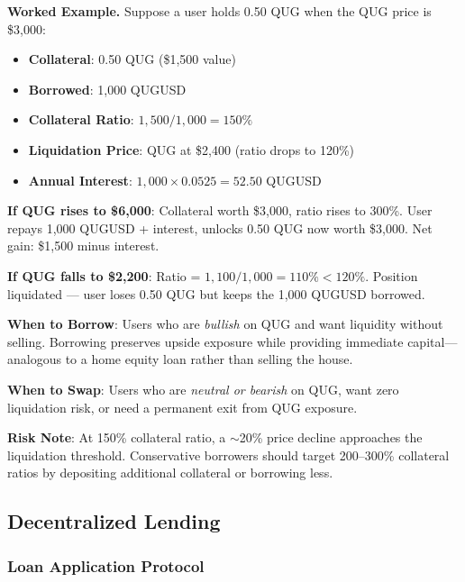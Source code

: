 \documentclass[11pt,a4paper]{article}
\begin{document}
\textbf{Worked Example.} Suppose a user holds 0.50 QUG when the QUG price is \$3{,}000:

\begin{tcolorbox}[colback=codebg,colframe=qnkblue!50!black,title=CDP Borrowing Scenario]
\begin{itemize}[leftmargin=*,noitemsep]
    \item \textbf{Collateral}: 0.50 QUG (\$1{,}500 value)
    \item \textbf{Borrowed}: 1{,}000 QUGUSD
    \item \textbf{Collateral Ratio}: $1{,}500 / 1{,}000 = 150\%$
    \item \textbf{Liquidation Price}: QUG at \$2{,}400 (ratio drops to 120\%)
    \item \textbf{Annual Interest}: $1{,}000 \times 0.0525 = 52.50$ QUGUSD
\end{itemize}

\textbf{If QUG rises to \$6{,}000}: Collateral worth \$3{,}000, ratio rises to 300\%. User repays 1{,}000 QUGUSD + interest, unlocks 0.50 QUG now worth \$3{,}000. Net gain: \$1{,}500 minus interest.

\textbf{If QUG falls to \$2{,}200}: Ratio = $1{,}100/1{,}000 = 110\% < 120\%$. Position liquidated — user loses 0.50 QUG but keeps the 1{,}000 QUGUSD borrowed.
\end{tcolorbox}

\textbf{When to Borrow}: Users who are \textit{bullish} on QUG and want liquidity without selling. Borrowing preserves upside exposure while providing immediate capital—analogous to a home equity loan rather than selling the house.

\textbf{When to Swap}: Users who are \textit{neutral or bearish} on QUG, want zero liquidation risk, or need a permanent exit from QUG exposure.

\textbf{Risk Note}: At 150\% collateral ratio, a $\sim$20\% price decline approaches the liquidation threshold. Conservative borrowers should target 200--300\% collateral ratios by depositing additional collateral or borrowing less.

\subsection{Decentralized Lending}

\subsubsection{Loan Application Protocol}
\end{document}
